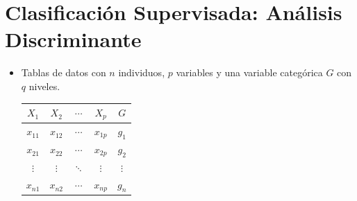 \section{Clasificaci\'on Supervisada: An\'alisis Discriminante}

\begin{itemize}
    \item Tablas de datos con $n$ individuos, $p$ variables y una variable categórica $G$ con $q$ niveles.
    
    \begin{center}
        \begin{tabular}{|cccc|c|}
            \hline
               $X_1$ &    $X_2$ & $\cdots$ &    $X_p$ &      $G$ \\
            \hline
            $x_{11}$ & $x_{12}$ & $\cdots$ & $x_{1p}$ &    $g_1$ \\
            $x_{21}$ & $x_{22}$ & $\cdots$ & $x_{2p}$ &    $g_2$ \\
            $\vdots$ & $\vdots$ & $\ddots$ & $\vdots$ & $\vdots$ \\
            $x_{n1}$ & $x_{n2}$ & $\cdots$ & $x_{np}$ &    $g_n$ \\
            \hline
        \end{tabular}
    \end{center}


\end{itemize}
